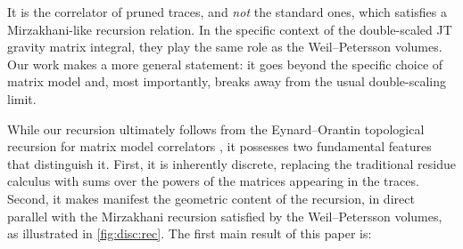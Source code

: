 \documentclass[a4paper,11pt,english]{article}
\theoremstyle{plain}
\theoremstyle{definition}
\theoremstyle{plain}
\begin{document}
It is the correlator of pruned traces, and \textit{not} the standard ones, which satisfies a Mirzakhani-like recursion relation. In the specific context of the double-scaled JT gravity matrix integral, they play the same role as the Weil--Petersson volumes. Our work makes a more general statement: it goes beyond the specific choice of matrix model and, most importantly, breaks away from the usual double-scaling limit.

While our recursion ultimately follows from the Eynard--Orantin topological recursion for matrix model correlators \cite{EO07}, it possesses two fundamental features that distinguish it. First, it is inherently discrete, replacing the traditional residue calculus with sums over the powers of the matrices appearing in the traces. Second, it makes manifest the geometric content of the recursion, in direct parallel with the Mirzakhani recursion satisfied by the Weil--Petersson volumes, as illustrated in \cref{fig:disc:rec}. The first main result of this paper is:
\end{document}
